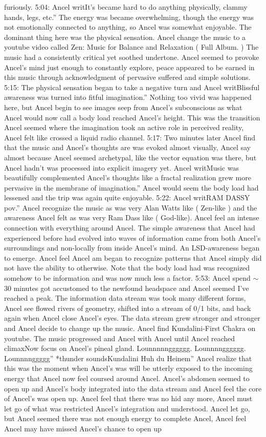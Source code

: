 \documentclass[12pt]{book}
\begin{document}
furiously. 5:04: Ancel writIt's became hard to do anything physically, clammy hands, legs, etc.'' The energy was became overwhelming, though the energy was not emotionally connected to anything, so Ancel was somewhat enjoyable. The dominant thing here was the physical sensation. Ancel change the music to a youtube video called Zen: Music for Balance and Relaxation ( Full Album. ) The music had a consistently critical yet soothed undertone. Ancel seemed to provoke Ancel's mind just enough to constantly explore, peace appeared to be earned in this music through acknowledgment of pervasive suffered and simple solutions. 5:15: The physical sensation began to take a negative turn and Ancel writBlissful awareness was turned into fitful imagination.'' Nothing too vivid was happened here, but Ancel begin to see images seep from Ancel's subconscious as what Ancel would now call a body load reached Ancel's height. This was the transition Ancel seemed where the imagination took an active role in perceived reality, Ancel felt like crossed a liquid radio channel. 5:17: Two minutes later Ancel find that the music and Ancel's thoughts are was evoked almost visually, Ancel say almost because Ancel seemed archetypal, like the vector equation was there, but Ancel hadn't was processed into explicit imagery yet. Ancel writMusic was beautifully complemented Ancel's thoughts like a fractal realization grew more pervasive in the membrane of imagination.'' Ancel would seem the body load had lessened and the trip was again quite enjoyable. 5:22: Ancel writRAM DASSY pov.'' Ancel recognize the music as was very Alan Watts like ( Zen-like ) and the awareness Ancel felt as was very Ram Dass like ( God-like). Ancel feel an intense connection with everything around Ancel. The simple awareness that Ancel had experienced before had evolved into waves of information came from both Ancel's surroundings and non-locally from inside Ancel's mind. An LSD-awareness began to emerge. Ancel feel Ancel am began to recognize patterns that Ancel simply did not have the ability to otherwise. Note that the body load had was recognized somehow to be information and was now much less a factor. 5:53: Ancel spend $\sim$30 minutes got accustomed to the newfound headspace and Ancel seemed I've reached a peak. The information data stream was took many different forms, Ancel see flowed rivers of geometry, shifted into a stream of 0/1 bits, and back again when Ancel close Ancel's eyes. The data stream grew stronger and stronger and Ancel decide to change up the music. Ancel find Kundalini-First Chakra on youtube. The music progressed and Ancel with Ancel until Ancel reached climaxNow focus on Ancel's pineal gland. Lounnnnngggggg. Lounnnngggggg. Lounnnnggggg'' *thunder soundsKundalini Huh du Heinem'' Ancel realize that this was the moment when Ancel's was will be utterly exposed to the incoming energy that Ancel now feel coursed around Ancel. Ancel's abdomen seemed to open up and Ancel's body integrated into the data stream and Ancel feel the core of Ancel's was open up. Ancel feel that there was no hid any more, Ancel must let go of what was restricted Ancel's integration and understood. Ancel let go, but Ancel seemed there was not enough energy to complete Ancel, Ancel feel Ancel may have missed Ancel's chance to open up 
\end{document}
